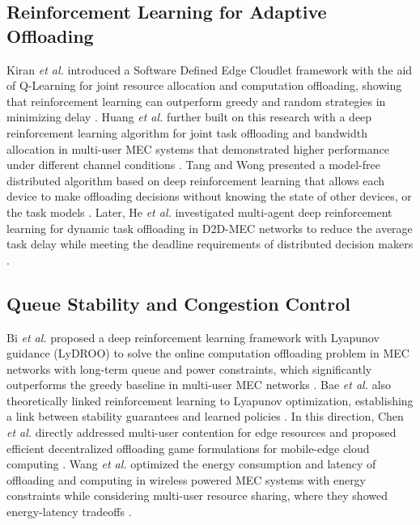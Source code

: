 \documentclass{ieeeaccess}
\begin{document}
\subsection{Reinforcement Learning for Adaptive Offloading}
Kiran \emph{et al.} introduced a Software Defined Edge Cloudlet framework with the aid of Q-Learning for joint resource allocation and computation offloading, showing that reinforcement learning can outperform greedy and random strategies in minimizing delay \cite{kiran2020}. Huang \emph{et al.} further built on this research with a deep reinforcement learning algorithm for joint task offloading and bandwidth allocation in multi-user MEC systems that demonstrated higher performance under different channel conditions \cite{huang2019}. Tang and Wong presented a model-free distributed algorithm based on deep reinforcement learning that allows each device to make offloading decisions without knowing the state of other devices, or the task models \cite{tang2022}. Later, He \emph{et al.} investigated multi-agent deep reinforcement learning for dynamic task offloading in D2D-MEC networks to reduce the average task delay while meeting the deadline requirements of distributed decision makers \cite{he2024}.

\subsection{Queue Stability and Congestion Control}
Bi \emph{et al.} proposed a deep reinforcement learning framework with Lyapunov guidance (LyDROO) to solve the online computation offloading problem in MEC networks with long-term queue and power constraints, which significantly outperforms the greedy baseline in multi-user MEC networks \cite{bi2021}. Bae \emph{et al.} also theoretically linked reinforcement learning to Lyapunov optimization, establishing a link between stability guarantees and learned policies \cite{bae2020}. In this direction, Chen \emph{et al.} directly addressed multi-user contention for edge resources and proposed efficient decentralized offloading game formulations for mobile-edge cloud computing \cite{chen2016}. Wang \emph{et al.} optimized the energy consumption and latency of offloading and computing in wireless powered MEC systems with energy constraints while considering multi-user resource sharing, where they showed energy-latency tradeoffs \cite{wang2018}.
\end{document}
